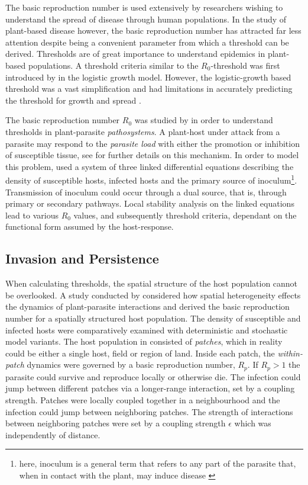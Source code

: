 The basic reproduction number is used extensively by researchers wishing to understand the spread of disease through human populations. In the study of plant-based disease however, the basic reproduction number has attracted far less attention despite being a convenient parameter from which a threshold can be derived. Thresholds are of great importance to understand epidemics in plant-based populations. A threshold criteria similar to the $R_0$-threshold was first introduced by \cite{van2013plant} in the logistic growth model. However, the logistic-growth based threshold was a vast simplification and had limitations in accurately predicting the threshold for growth and spread \cite{onstad1992evaluation}.

The basic reproduction number $R_0$ was studied by \cite{gubbins2000population} in order to understand thresholds in plant-parasite \textit{pathosystems}. A plant-host under attack from a parasite may respond to the \textit{parasite load} with either the promotion or inhibition of susceptible tissue, see \cite{gilligan1997analysis} for further details on this mechanism. In order to model this problem, \cite{gubbins2000population} used a system of three linked differential equations describing the density of susceptible hosts, infected hosts and the primary source of inoculum\footnote{\textemdash here, inoculum is a general term that refers to any part of the parasite that, when in contact with the plant, may induce disease \cite{agrios2005chapter}}. Transmission of inoculum could occur through a dual source, that is, through primary or secondary pathways. Local stability analysis on the linked equations lead to various $R_0$ values, and subsequently threshold criteria, dependant on the functional form assumed by the host-response.\\

\subsection{Invasion and Persistence}
\label{ch3:invasions_and_persistence}
When calculating thresholds, the spatial structure of the host population cannot be overlooked. A study conducted by \cite{park2001invasion} considered how spatial heterogeneity effects the dynamics of plant-parasite interactions and derived the basic reproduction number for a spatially structured host population. The density of susceptible and infected hosts were comparatively examined with deterministic and stochastic model variants. The host population in \cite{park2001invasion} consisted of \textit{patches}, which in reality could be either a single host, field or region of land. Inside each patch, the \textit{within-patch} dynamics were governed by a basic reproduction number, $R_p$. If $R_p > 1$ the parasite could survive and reproduce locally or otherwise die. The infection could jump between different patches via a longer-range interaction, set by a coupling strength. Patches were locally coupled together in a neighbourhood and the infection could jump between neighboring patches. The strength of interactions between neighboring patches were set by a coupling strength $\epsilon$ which was independently of distance.

